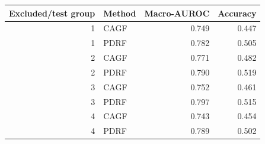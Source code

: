 \begin{tabular}{rlrr}
\toprule
Excluded/test group & Method & Macro-AUROC & Accuracy\\
\midrule
1 & CAGF & 0.749 & 0.447\\
1 & PDRF & 0.782 & 0.505\\
2 & CAGF & 0.771 & 0.482\\
2 & PDRF & 0.790 & 0.519\\
3 & CAGF & 0.752 & 0.461\\
3 & PDRF & 0.797 & 0.515\\
4 & CAGF & 0.743 & 0.454\\
4 & PDRF & 0.789 & 0.502\\
\bottomrule
\end{tabular}
